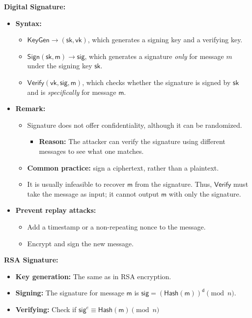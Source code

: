 \documentclass{article}
\newcommand{\msf}[1]{\mathsf{#1}}
\newcommand{\parhead}[1]{\noindent \textbf{#1}}
\begin{document}
\parhead{Digital Signature:}
\begin{itemize}
    \item {\bf Syntax:}
    \begin{itemize}
        \item $\mathsf{KeyGen}\rightarrow(\msf{sk},\msf{vk})$, which generates a signing key and a verifying key.
        
        \item $\mathsf{Sign}(\msf{sk},\msf{m})\rightarrow\msf{sig}$, which generates a signature \emph{only} for message $m$ under the signing key $\msf{sk}$.
        
        \item $\mathsf{Verify}(\msf{vk},\msf{sig},\msf{m})$, which checks whether the signature is signed by $\msf{sk}$ and is \emph{specifically} for message $\msf{m}$.
    \end{itemize}
    \item {\bf Remark:}
        \begin{itemize}
            \item Signature does not offer confidentiality, although it can be randomized.
            \begin{itemize}
                \item {\bf Reason:} The attacker can verify the signature using different messages to see what one matches.
            \end{itemize} 
            
            \item {\bf Common practice:} sign a ciphertext, rather than a plaintext.
            
            \item It is usually infeasible to recover $\msf{m}$ from the signature. Thus, $\msf{Verify}$ must take the message as input; it cannot output $\msf{m}$ with only the signature.
        \end{itemize}
        
        
    \item {\bf Prevent replay attacks:}
    \begin{itemize}
        \item Add a timestamp or a non-repeating nonce to the message.
        \item Encrypt and sign the new message. 
    \end{itemize}
\end{itemize}

\parhead{RSA Signature:}
    \begin{itemize}
        \item {\bf Key generation:} The same as in RSA encryption.
        
        \item {\bf Signing:} The signature for message $\msf{m}$ is $\msf{sig}=(\msf{Hash}(\msf{m}))^\msf{d}\pmod{n}$.
        
        \item {\bf Verifying:} Check if $\msf{sig}^e \equiv\msf{Hash}(\msf{m})\pmod{n}$
    \end{itemize}
\end{document}
